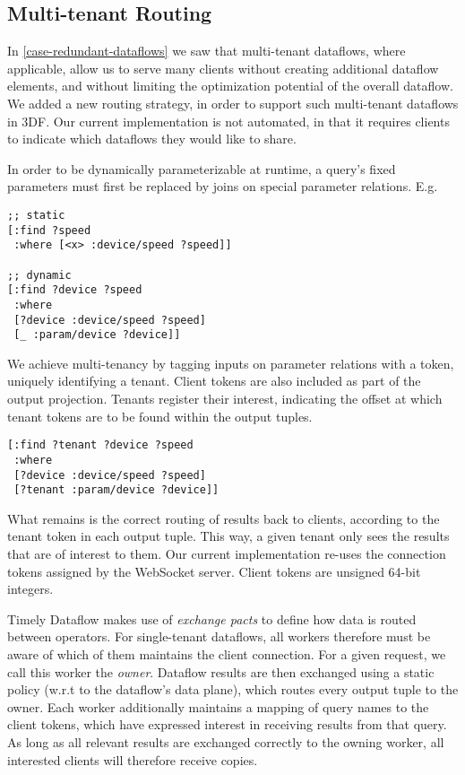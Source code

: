 \documentclass[../index.tex]{subfiles}
\begin{document}
\subsection{Multi-tenant Routing}

In \autoref{case-redundant-dataflows} we saw that multi-tenant
dataflows, where applicable, allow us to serve many clients without
creating additional dataflow elements, and without limiting the
optimization potential of the overall dataflow. We added a new routing
strategy, in order to support such multi-tenant dataflows in 3DF. Our
current implementation is not automated, in that it requires clients
to indicate which dataflows they would like to share.

In order to be dynamically parameterizable at runtime, a query's fixed
parameters must first be replaced by joins on special parameter
relations. E.g.

\begin{lstlisting}[language=datalog, style=colorlog]
;; static
[:find ?speed
 :where [<x> :device/speed ?speed]]  

;; dynamic
[:find ?device ?speed
 :where
 [?device :device/speed ?speed]
 [_ :param/device ?device]]
\end{lstlisting}

We achieve multi-tenancy by tagging inputs on parameter relations with
a token, uniquely identifying a tenant. Client tokens are also
included as part of the output projection. Tenants register their
interest, indicating the offset at which tenant tokens are to be found
within the output tuples.

\begin{lstlisting}[language=datalog, style=colorlog]
[:find ?tenant ?device ?speed
 :where
 [?device :device/speed ?speed]
 [?tenant :param/device ?device]]
\end{lstlisting}

What remains is the correct routing of results back to clients,
according to the tenant token in each output tuple. This way, a given
tenant only sees the results that are of interest to them. Our current
implementation re-uses the connection tokens assigned by the WebSocket
server. Client tokens are unsigned 64-bit integers.

Timely Dataflow makes use of \emph{exchange pacts} to define how data
is routed between operators. For single-tenant dataflows, all workers
therefore must be aware of which of them maintains the client
connection. For a given request, we call this worker the
\emph{owner}. Dataflow results are then exchanged using a static
policy (w.r.t to the dataflow's data plane), which routes every output
tuple to the owner. Each worker additionally maintains a mapping of
query names to the client tokens, which have expressed interest in
receiving results from that query. As long as all relevant results are
exchanged correctly to the owning worker, all interested clients will
therefore receive copies.
\end{document}
